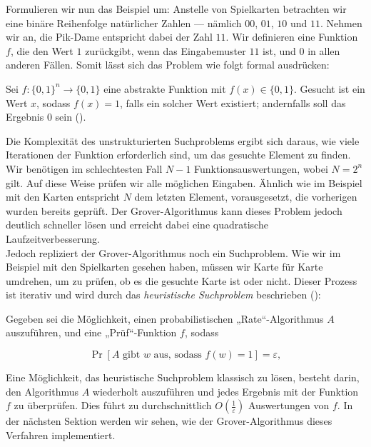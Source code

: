 Formulieren wir nun das Beispiel um: Anstelle von Spielkarten betrachten wir eine binäre Reihenfolge natürlicher Zahlen — nämlich $00$, $01$, $10$ und $11$. Nehmen wir an, die Pik-Dame entspricht dabei der Zahl $11$. Wir definieren eine Funktion $f$, die den Wert $1$ zurückgibt, wenn das Eingabemuster $11$ ist, und $0$ in allen anderen Fällen. Somit lässt sich das Problem wie folgt formal ausdrücken:

\begin{definition}
Sei $f\colon \{0, 1\}^n \rightarrow \{0, 1\}$ eine abstrakte Funktion mit $f(x) \in \{0, 1\}$. Gesucht ist ein Wert $x$, sodass $f(x) = 1$, falls ein solcher Wert existiert; andernfalls soll das Ergebnis $0$ sein (\cite{montanaro_quantum_2016}).
\end{definition}

Die Komplexität des unstrukturierten Suchproblems ergibt sich daraus, wie viele Iterationen der Funktion erforderlich sind, um das gesuchte Element zu finden. Wir benötigen im schlechtesten Fall $N - 1$ Funktionsauswertungen, wobei $N = 2^n$ gilt. Auf diese Weise prüfen wir alle möglichen Eingaben. Ähnlich wie im Beispiel mit den Karten entspricht $N$ dem letzten Element, vorausgesetzt, die vorherigen wurden bereits geprüft. Der Grover-Algorithmus kann dieses Problem jedoch deutlich schneller lösen und erreicht dabei eine quadratische Laufzeitverbesserung.\\

Jedoch repliziert der Grover-Algorithmus noch ein Suchproblem. Wie wir im Beispiel mit den Spielkarten gesehen haben, müssen wir Karte für Karte umdrehen, um zu prüfen, ob es die gesuchte Karte ist oder nicht. Dieser Prozess ist iterativ und wird durch das \textit{heuristische Suchproblem} beschrieben (\cite{montanaro_quantum_2016}):

\begin{definition}
Gegeben sei die Möglichkeit, einen probabilistischen „Rate“-Algorithmus \( A \) auszuführen, und eine „Prüf“-Funktion \( f \), sodass

\[
\Pr\left[ A \text{ gibt } w \text{ aus, sodass } f(w) = 1 \right] = \varepsilon,
\]
\end{definition}

Eine Möglichkeit, das heuristische Suchproblem klassisch zu lösen, besteht darin, den Algorithmus \( A \) wiederholt auszuführen und jedes Ergebnis mit der Funktion \( f \) zu überprüfen. Dies führt zu durchschnittlich \( O\left(\frac{1}{\varepsilon}\right) \) Auswertungen von \( f \). In der nächsten Sektion werden wir sehen, wie der Grover-Algorithmus dieses Verfahren implementiert.

